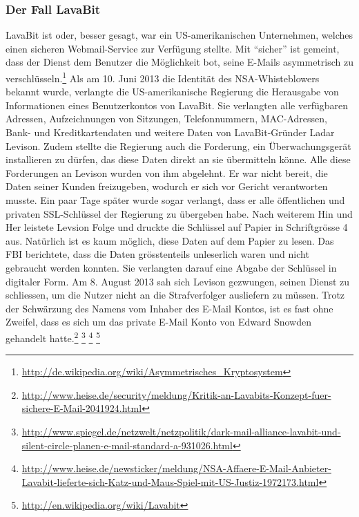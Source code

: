 \subsubsection{Der Fall LavaBit}
LavaBit ist oder, besser gesagt, war ein US-amerikanischen Unternehmen, welches einen sicheren Webmail-Service zur Verfügung stellte.
Mit ``sicher'' ist gemeint, dass der Dienst dem Benutzer die Möglichkeit bot, seine E-Mails asymmetrisch zu verschlüsseln.\footnote{\url{http://de.wikipedia.org/wiki/Asymmetrisches_Kryptosystem}}
Als am 10. Juni 2013 die Identität des NSA-Whisteblowers bekannt wurde, verlangte die US-amerikanische Regierung die Herausgabe von Informationen eines Benutzerkontos von LavaBit.
Sie verlangten alle verfügbaren Adressen, Aufzeichnungen von Sitzungen, Telefonnummern, MAC-Adressen, Bank- und Kreditkartendaten und weitere Daten von LavaBit-Gründer Ladar Levison. Zudem stellte die Regierung auch die Forderung, ein Überwachungsgerät installieren zu dürfen, das diese Daten direkt an sie übermitteln könne. Alle diese Forderungen an Levison wurden von ihm abgelehnt. Er war nicht bereit, die Daten seiner Kunden freizugeben, wodurch er sich vor Gericht verantworten musste.
Ein paar Tage später wurde sogar verlangt, dass er alle öffentlichen und privaten SSL-Schlüssel der Regierung zu übergeben habe. Nach weiterem Hin und Her leistete Levsion Folge und druckte die Schlüssel auf Papier in Schriftgrösse 4 aus. Natürlich ist es kaum möglich, diese Daten auf dem Papier zu lesen. Das FBI berichtete, dass die Daten grösstenteils unleserlich waren und nicht gebraucht werden konnten. Sie verlangten darauf eine Abgabe der Schlüssel in digitaler Form.
Am 8. August 2013 sah sich Levison gezwungen, seinen Dienst zu schliessen, um die Nutzer nicht an die Strafverfolger ausliefern zu müssen.
Trotz der Schwärzung des Namens vom Inhaber des E-Mail Kontos, ist es fast ohne Zweifel, dass es sich um das private E-Mail Konto von Edward Snowden gehandelt hatte.\footnote{\url{http://www.heise.de/security/meldung/Kritik-an-Lavabits-Konzept-fuer-sichere-E-Mail-2041924.html}}
\footnote{\url{http://www.spiegel.de/netzwelt/netzpolitik/dark-mail-alliance-lavabit-und-silent-circle-planen-e-mail-standard-a-931026.html}}
\footnote{\url{http://www.heise.de/newsticker/meldung/NSA-Affaere-E-Mail-Anbieter-Lavabit-lieferte-sich-Katz-und-Maus-Spiel-mit-US-Justiz-1972173.html}}
\footnote{\url{http://en.wikipedia.org/wiki/Lavabit}}

